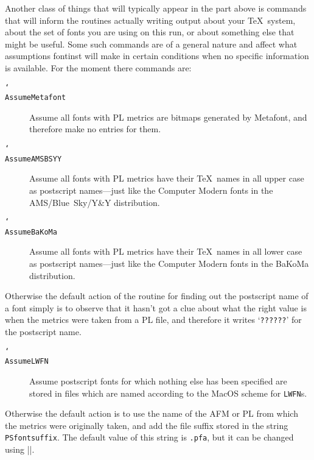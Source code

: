 \documentclass[a4paper]{ltxguide}
\newcommand*{\meta}{\m}
\newcommand*{\cs}[1]{\texttt{\char`\\ #1}\xspace}
\newcommand*{\setpackagename}[1]{\textsf{#1}}
\newcommand{\fontinst}{\setpackagename{font\-inst}\xspace}
\begin{document}
Another class of things that will typically appear in the 
\meta{general settings} part above is commands that will inform the 
routines actually writing output about your \TeX\ system, about the set 
of fonts you are using on this run, or about something else that might 
be useful. Some such commands are of a general nature and affect what 
assumptions \fontinst will make in certain conditions when no 
specific information is available. For the moment there commands are:
\begin{description}
  \item[\cs{AssumeMetafont}] Assume all fonts with PL metrics are 
    bitmaps generated by Metafont, and therefore make no entries for 
    them.
  \item[\cs{AssumeAMSBSYY}] Assume all fonts with PL metrics have their 
    \TeX\ names in all upper case as postscript names---just like the 
    Computer Modern fonts in the AMS\slash Blue~Sky\slash Y\&Y 
    distribution.
  \item[\cs{AssumeBaKoMa}] Assume all fonts with PL metrics have their 
    \TeX\ names in all lower case as postscript names---just like the 
    Computer Modern fonts in the BaKoMa distribution.
\end{description}
Otherwise the default action of the routine for finding out the 
postscript name of a font simply is to observe that it hasn't got a clue 
about what the right value is when the metrics were taken from a PL 
file, and therefore it writes `\texttt{??????}' for the postscript name.
\begin{description}
  \item[\cs{AssumeLWFN}] Assume postscript fonts for which nothing 
    else has been specified are stored in files which are named 
    according to the \mbox{MacOS} scheme for 
    \texttt{LWFN}s.%
\end{description}
Otherwise the default action is to use the name of the AFM or PL from 
which the metrics were originally taken, and add the file suffix stored 
in the string \texttt{PSfontsuffix}. The default value of this string 
is \texttt{.pfa}, but it can be changed using |\resetstr|.
\end{document}
